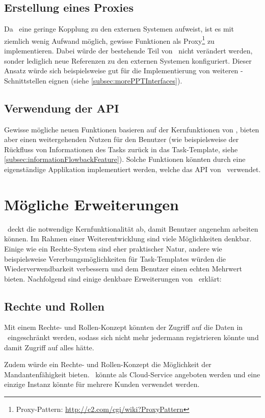 		\subsection{Erstellung eines Proxies}
			Da \eeppi\ eine geringe Kopplung zu den externen Systemen aufweist,
			 ist es mit ziemlich wenig Aufwand möglich,
			gewisse Funktionen als Proxy\footnote{Proxy-Pattern: \url{http://c2.com/cgi/wiki?ProxyPattern}} zu implementieren.
			Dabei würde der bestehende Teil von \eeppi\ nicht verändert werden,
			sonder lediglich neue Referenzen zu den externen Systemen konfiguriert.
			Dieser Ansatz würde sich beispielsweise gut für die Implementierung von weiteren \ppt-Schnittstellen eignen (siehe \ref{subsec:morePPTInterfaces}).
			
		\subsection{Verwendung der API}
			Gewisse mögliche neuen Funktionen basieren auf der Kernfunktionen von \eeppi,
			bieten aber einen weitergehenden Nutzen für den Benutzer
			(wie beispielsweise der Rückfluss von Informationen des Tasks zurück in das Task-Template, siehe \ref{subsec:informationFlowbackFeature}).
			Solche Funktionen könnten durch eine eigenständige Applikation implementiert werden,
			welche das API von \eeppi\ verwendet.


	\section{Mögliche Erweiterungen}
		\eeppi\ deckt die notwendige Kernfunktionalität ab, damit Benutzer angenehm arbeiten können.
		Im Rahmen einer Weiterentwicklung sind viele Möglichkeiten denkbar. 
		Einige wie ein Rechte-System sind eher praktischer Natur, 
		andere wie beispielsweise Vererbungsmöglichkeiten für Task-Templates würden die Wiederverwendbarkeit verbessern und dem Benutzer einen echten Mehrwert bieten.
		Nachfolgend sind einige denkbare Erweiterungen von \eeppi\ erklärt:
		
		\subsection{Rechte und Rollen}
			Mit einem Rechte- und Rollen-Konzept könnten der Zugriff auf die Daten in \eeppi\ eingeschränkt werden,
			sodass sich nicht mehr jedermann registrieren könnte und damit Zugriff auf alles hätte.
			
			Zudem würde ein Rechte- und Rollen-Konzept die Möglichkeit der Mandantenfähigkeit bieten.
			\eeppi\ könnte als Cloud-Service angeboten werden und eine einzige Instanz könnte für mehrere Kunden verwendet werden.
			

